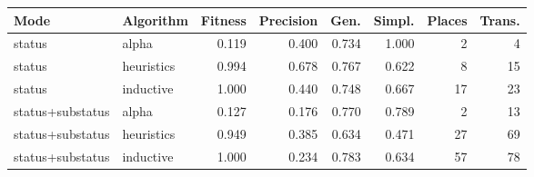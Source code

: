 \begin{tabular}{llrrrrrr}
\toprule
Mode & Algorithm & Fitness & Precision & Gen. & Simpl. & Places & Trans. \\
\midrule
status & alpha & 0.119 & 0.400 & 0.734 & 1.000 & 2 & 4 \\
status & heuristics & 0.994 & 0.678 & 0.767 & 0.622 & 8 & 15 \\
status & inductive & 1.000 & 0.440 & 0.748 & 0.667 & 17 & 23 \\
status+substatus & alpha & 0.127 & 0.176 & 0.770 & 0.789 & 2 & 13 \\
status+substatus & heuristics & 0.949 & 0.385 & 0.634 & 0.471 & 27 & 69 \\
status+substatus & inductive & 1.000 & 0.234 & 0.783 & 0.634 & 57 & 78 \\
\bottomrule
\end{tabular}

